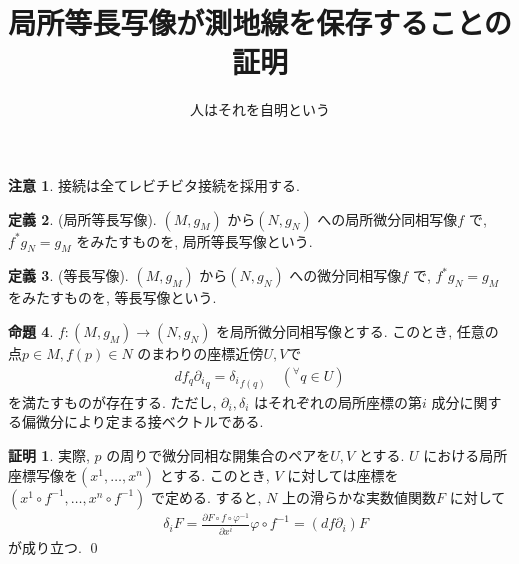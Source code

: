 \documentclass[twocolumn, landscape, a4paper , 8pt, fleqn, titlepage ]{jsarticle}
\title{局所等長写像が測地線を保存することの証明}
\author{人はそれを自明という}
\date{}
\theoremstyle{definition}
\newtheorem{dfn}{定義}[section]
\newtheorem{prop}[dfn]{命題}
\newtheorem*{pf*}{証明}
\newtheorem{remark}[dfn]{注意}
\newcommand{\any}{{}^{\forall}}
\begin{document}
\maketitle
\scriptsize 



\section{}

\begin{remark}
接続は全てレビチビタ接続を採用する. 
\end{remark}


\begin{dfn}(局所等長写像).
$(M,g_M)$ から$(N, g_N)$ への局所微分同相写像$f$ で, $f^* g_N = g_M$ をみたすものを, 局所等長写像という.
\end{dfn}

\begin{dfn}(等長写像).
$(M,g_M)$ から$(N, g_N)$ への微分同相写像$f$ で, $f^* g_N = g_M$ をみたすものを, 等長写像という.
\end{dfn}


\begin{prop}
$f: (M,g_M) \rightarrow (N,g_N)$ を局所微分同相写像とする. このとき, 任意の点$p \in M, f(p) \in N$ のまわりの座標近傍$U, V$で
\begin{align*} df_q {\partial_i} _q  = {\delta_i }_{f(q) }  \quad (\any q \in U)\end{align*}
を満たすものが存在する. ただし, $\partial_i, \delta_i$ はそれぞれの局所座標の第$i$ 成分に関する偏微分により定まる接ベクトルである. 
\end{prop}
\begin{pf*}
実際, $p$ の周りで微分同相な開集合のペアを$U, V$ とする. $U $ における局所座標写像を$(x^1, \ldots, x^n)$ とする. このとき, $V$ に対しては座標を$(x^1 \circ f^{-1}, \ldots, x^n \circ f^{-1})$ で定める. すると, $N$ 上の滑らかな実数値関数$F$ に対して
\begin{align*} & \delta_i F = \frac{\partial F \circ f \circ \varphi^{-1} }{ \partial x^i} \varphi \circ f^{-1} = (df \partial_i ) F   \end{align*}
が成り立つ. 
\qed
\end{pf*}
\end{document}
